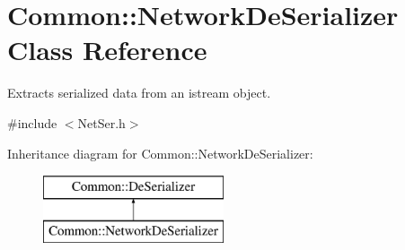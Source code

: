 \hypertarget{class_common_1_1_network_de_serializer}{\section{Common\-:\-:Network\-De\-Serializer Class Reference}
\label{class_common_1_1_network_de_serializer}
}


Extracts serialized data from an istream object.  




{\ttfamily \#include $<$Net\-Ser.\-h$>$}

Inheritance diagram for Common\-:\-:Network\-De\-Serializer\-:\begin{figure}[H]
\begin{center}
\leavevmode
\includegraphics[height=2.000000cm]{class_common_1_1_network_de_serializer}
\end{center}
\end{figure}
